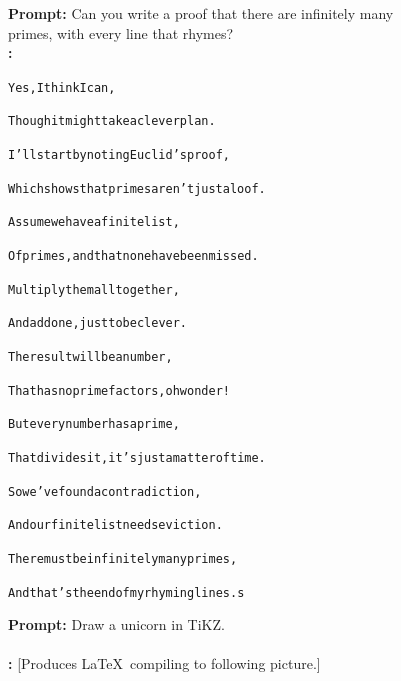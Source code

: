    \begin{figure}
    \begin{AIbox}{\DV}
    \parbox[t]{0.55\linewidth}{
    {\small {\bf Prompt:} Can you write a proof that there are infinitely many primes, with every line that rhymes?}\\
    
    {\small\bf \DV:} \scriptsize \begin{alltt}
    Yes, I think I can,
    
    Though it might take a clever plan. 
    
    I'll start by noting Euclid's proof, 
    
    Which shows that primes aren't just aloof. 
    
    Assume we have a finite list, 
    
    Of primes, and that none have been missed. 
    
    Multiply them all together, 
    
    And add one, just to be clever. 
    
    The result will be a number, 
    
    That has no prime factors, oh wonder! 
    
    But every number has a prime, 
    
    That divides it, it's just a matter of time. 
    
    So we've found a contradiction, 
    
    And our finite list needs eviction. 
    
    There must be infinitely many primes, 
    
    And that's the end of my rhyming lines.s
    \end{alltt}}
    \hspace{0.2in}
    \parbox[t]{0.4\linewidth}{\small {\bf Prompt:} Draw a unicorn in TiKZ.\\\ \\
    
    {\bf \DV:}
    {\scriptsize [Produces \LaTeX\ compiling to following picture.]} \\
    
}
\end{AIbox}
\end{figure}
